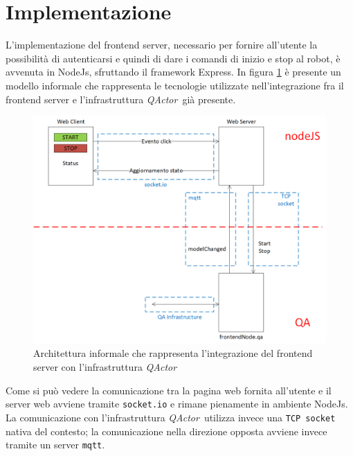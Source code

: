 \documentclass{llncs}
\newcommand{\version}{7}
\newcommand{\action}[1]{\texttt{#1}\xspace}
\newcommand{\node}{\textsf{NodeJs}}
\newcommand{\qa}{\textsf{\textit{QActor}}}
\newcommand{\labelsec}[1]{\label{sec:#1}}
\begin{document}
\section{Implementazione}
\labelsec{Implementation}

L'implementazione del frontend server, necessario per fornire all'utente la possibilità di autenticarsi e quindi di dare i comandi di inizio e stop al robot, è avvenuta in \node, sfruttando il framework Express. In figura \ref{fig:frontend} è presente un modello informale che rappresenta le tecnologie utilizzate nell'integrazione fra il frontend server e l'infrastruttura \qa\ già presente.

\begin{figure}
	\centering
	\includegraphics[scale=0.5]{img/frontend.png}
	\caption{Architettura informale che rappresenta l'integrazione del frontend server con l'infrastruttura \qa}
	\label{fig:frontend}
\end{figure}

Come si può vedere la comunicazione tra la pagina web fornita all'utente e il server web avviene tramite \action{socket.io} e rimane pienamente in ambiente \node. La comunicazione con l'infrastruttura \qa\ utilizza invece una \action{TCP socket} nativa del contesto; la comunicazione nella direzione opposta avviene invece tramite un server \action{mqtt}.
\end{document}
